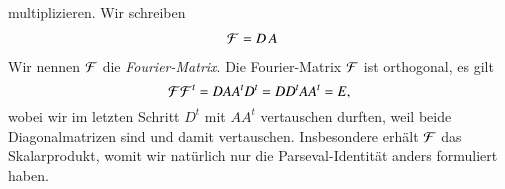 multiplizieren.
Wir schreiben
\begin{align*}
{\cal F}
&=
D\, A
\end{align*}
Wir nennen $\cal F$ die {\em Fourier-Matrix}.
%
Die Fourier-Matrix $\cal F$ ist orthogonal, es gilt
\[
{\cal F}{\cal F}^t
=
DAA^tD^t
=
DD^tAA^t
=
E,
\]
wobei wir im letzten Schritt $D^t$ mit $AA^t$ vertauschen durften,
weil beide Diagonalmatrizen sind und damit vertauschen.
Insbesondere erhält $\cal F$ das Skalarprodukt, womit wir natürlich
nur die Parseval-Identität anders formuliert haben.




